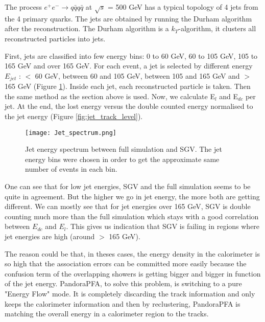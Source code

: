 \documentclass[a4paper,12pt]{article}
\begin{document}
The process $e^+e^- \rightarrow q\bar{q} q\bar{q}$ at $\sqrt{s}$ = 500 GeV has a typical topology of 4 jets from the 4 primary quarks. The jets are obtained by running the Durham algorithm after the reconstruction. The Durham algorithm is a $k_T$-algorithm, it clusters all reconstructed particles into jets. 

First, jets are classified into few energy bins: 0 to 60 GeV, 60 to 105 GeV, 105 to 165 GeV and over 165 GeV. For each event, a jet is selected by different energy $E_{jet}$ :  $<$ 60 GeV, between 60 and 105 GeV, between 105 and 165 GeV and $>$ 165 GeV (Figure \ref{fig:jet_spec}). Inside each jet,  each reconstructed particle is taken. Then the same method as the section above is used. Now, we calculate E$_l$ and E$_{dc}$ per jet. At the end, the lost energy versus the double counted energy normalised to the jet energy (Figure \ref{fig:jet_track_level}).

\begin{figure}[!h]
   \centering
  \texttt{[image: Jet\_spectrum.png]} 
      \caption{Jet energy spectrum between full simulation and SGV. The jet energy bins were chosen in order to get the approximate same number of events in each bin.}
   \label{fig:jet_spec}
\end{figure}

One can see that for low jet energies, SGV and the full simulation seems to be quite in agreement. But the higher we go in jet energy, the more both are getting different. We can mostly see that for jet energies over 165 GeV, SGV is double counting much more than the full simulation which stays with a good correlation between $E_{dc}$ and $E_{l}$. This gives us indication that SGV is failing in regions where jet energies are high (around $>$ 165 GeV). 

The reason could be that, in theses cases, the energy density in the calorimeter is so high that the association errors can be committed more easily because the confusion term of the overlapping showers is getting bigger and bigger in function of the jet energy. PandoraPFA, to solve this problem, is switching to a pure "Energy Flow" mode. It is completely discarding the track information and only keeps the calorimeter information and then by reclustering, PandoraPFA is matching the overall energy in a calorimeter region to the tracks.
\end{document}
